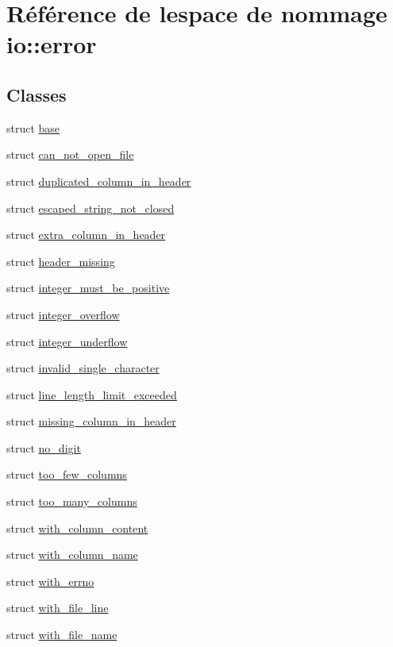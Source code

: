 \hypertarget{namespaceio_1_1error}{}\section{Référence de l\textquotesingle{}espace de nommage io\+:\+:error}
\label{namespaceio_1_1error}
\subsection*{Classes}
\begin{DoxyCompactItemize}
\item 
struct \hyperlink{structio_1_1error_1_1base}{base}
\item 
struct \hyperlink{structio_1_1error_1_1can__not__open__file}{can\+\_\+not\+\_\+open\+\_\+file}
\item 
struct \hyperlink{structio_1_1error_1_1duplicated__column__in__header}{duplicated\+\_\+column\+\_\+in\+\_\+header}
\item 
struct \hyperlink{structio_1_1error_1_1escaped__string__not__closed}{escaped\+\_\+string\+\_\+not\+\_\+closed}
\item 
struct \hyperlink{structio_1_1error_1_1extra__column__in__header}{extra\+\_\+column\+\_\+in\+\_\+header}
\item 
struct \hyperlink{structio_1_1error_1_1header__missing}{header\+\_\+missing}
\item 
struct \hyperlink{structio_1_1error_1_1integer__must__be__positive}{integer\+\_\+must\+\_\+be\+\_\+positive}
\item 
struct \hyperlink{structio_1_1error_1_1integer__overflow}{integer\+\_\+overflow}
\item 
struct \hyperlink{structio_1_1error_1_1integer__underflow}{integer\+\_\+underflow}
\item 
struct \hyperlink{structio_1_1error_1_1invalid__single__character}{invalid\+\_\+single\+\_\+character}
\item 
struct \hyperlink{structio_1_1error_1_1line__length__limit__exceeded}{line\+\_\+length\+\_\+limit\+\_\+exceeded}
\item 
struct \hyperlink{structio_1_1error_1_1missing__column__in__header}{missing\+\_\+column\+\_\+in\+\_\+header}
\item 
struct \hyperlink{structio_1_1error_1_1no__digit}{no\+\_\+digit}
\item 
struct \hyperlink{structio_1_1error_1_1too__few__columns}{too\+\_\+few\+\_\+columns}
\item 
struct \hyperlink{structio_1_1error_1_1too__many__columns}{too\+\_\+many\+\_\+columns}
\item 
struct \hyperlink{structio_1_1error_1_1with__column__content}{with\+\_\+column\+\_\+content}
\item 
struct \hyperlink{structio_1_1error_1_1with__column__name}{with\+\_\+column\+\_\+name}
\item 
struct \hyperlink{structio_1_1error_1_1with__errno}{with\+\_\+errno}
\item 
struct \hyperlink{structio_1_1error_1_1with__file__line}{with\+\_\+file\+\_\+line}
\item 
struct \hyperlink{structio_1_1error_1_1with__file__name}{with\+\_\+file\+\_\+name}
\end{DoxyCompactItemize}
